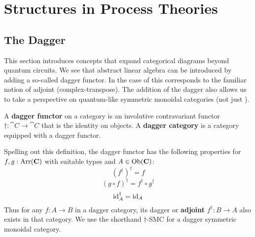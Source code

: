 \chapter{Structures in Process Theories}
\label{chap:cqm}


\section{The Dagger}
\label{sec:dag}
This section introduces concepts that expand categorical diagrams beyond quantum circuits. We see that abstract linear algebra can be introduced by adding a so-called dagger functor.  In the case of  this corresponds to the familiar notion of adjoint (complex-transpose).  The addition of the dagger also allows us to take a perspective on quantum-like symmetric monoidal categories (not just ). 

\begin{defn}
\label{defn:dagger}
A \textbf{dagger functor} on a category  is an involutive contravariant functor $\dagger:\cat{C}\to\cat{C}$ that is the identity on objects. A \textbf{dagger category} is a category equipped with a dagger functor.
\end{defn}
Spelling out this definition, the dagger functor has the following properties for $f,g:\mbox{Arr}(\mathbf{C})$ with suitable types and $A\in\mbox{Ob}(\mathbf{C})$:
\begin{equation}
\left(f^{\dagger}\right)^{\dagger} = f 
\end{equation}
\begin{equation}
(g\circ f)^{\dagger} = f^{\dagger}\circ g^{\dagger}
\end{equation}
\begin{equation}
\mbox{id}_{A}^{\dagger} = \mbox{id}_{A}
\end{equation}
Thus for any $f:A\to B$ in a dagger category, its dagger or \textbf{adjoint} $f^{\dagger}:B\to A$ also exists in that category. We use the shorthand $\dagger$-SMC for a dagger symmetric monoidal category.

